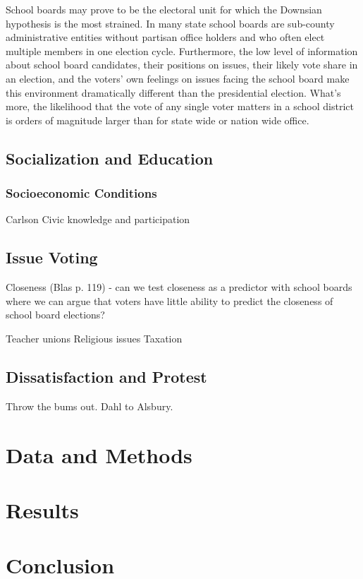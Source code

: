School boards may prove to be the electoral unit for which the Downsian hypothesis 
is the most strained. In many state school boards are sub-county administrative 
entities without partisan office holders and who often elect multiple members in 
one election cycle. Furthermore, the low level of information about school board 
candidates, their positions on issues, their likely vote share in an election, and 
the voters' own feelings on issues facing the school board make this environment 
dramatically different than the presidential election. What's more, the likelihood 
that the vote of any single voter matters in a school district is orders of 
magnitude larger than for state wide or nation wide office. 

\subsection{Socialization and Education}

\subsubsection{Socioeconomic Conditions}


Carlson
Civic knowledge and participation

\subsection{Issue Voting}

Closeness (Blas p. 119) - can we test closeness as a predictor with school boards 
where we can argue that voters have little ability to predict the closeness 
of school board elections? 


Teacher unions
Religious issues
Taxation

\subsection{Dissatisfaction and Protest}

Throw the bums out. Dahl to Alsbury. 


\section{Data and Methods}


\section{Results}


\section{Conclusion}

